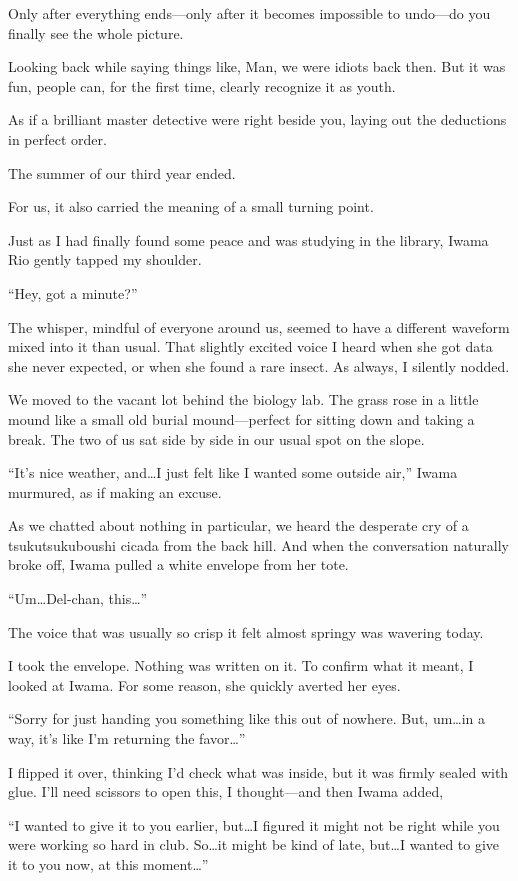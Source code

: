 \documentclass[
    a4paper,
    12pt,
    twoside,
    openany,
    UTF8,
    fontset=windows
]{ctexbook}
\begin{document}
Only after everything ends---only after it becomes impossible to undo---do you finally see the whole picture.

Looking back while saying things like, Man, we were idiots back then. But it was fun, people can, for the first time, clearly recognize it as youth.

As if a brilliant master detective were right beside you, laying out the deductions in perfect order.

The summer of our third year ended.

For us, it also carried the meaning of a small turning point.

Just as I had finally found some peace and was studying in the library, Iwama Rio gently tapped my shoulder.

``Hey, got a minute?''

The whisper, mindful of everyone around us, seemed to have a different waveform mixed into it than usual. That slightly excited voice I heard when she got data she never expected, or when she found a rare insect. As always, I silently nodded.

We moved to the vacant lot behind the biology lab. The grass rose in a little mound like a small old burial mound---perfect for sitting down and taking a break. The two of us sat side by side in our usual spot on the slope.

``It's nice weather, and\dots I just felt like I wanted some outside air,'' Iwama murmured, as if making an excuse.

As we chatted about nothing in particular, we heard the desperate cry of a tsukutsukuboushi cicada from the back hill. And when the conversation naturally broke off, Iwama pulled a white envelope from her tote.

``Um\dots Del-chan, this\dots''

The voice that was usually so crisp it felt almost springy was wavering today.

I took the envelope. Nothing was written on it. To confirm what it meant, I looked at Iwama.
For some reason, she quickly averted her eyes.

``Sorry for just handing you something like this out of nowhere. But, um\dots in a way, it's like I'm returning the favor\dots''

I flipped it over, thinking I'd check what was inside, but it was firmly sealed with glue. I'll need scissors to open this, I thought---and then Iwama added,

``I wanted to give it to you earlier, but\dots I figured it might not be right while you were working so hard in club. So\dots it might be kind of late, but\dots I wanted to give it to you now, at this moment\dots''
\end{document}
